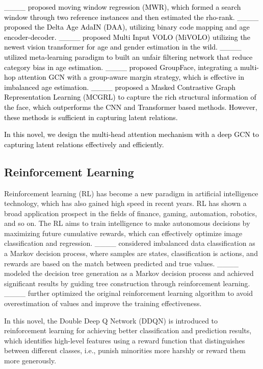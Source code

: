 \textcolor{black}{
____ proposed moving window regression (MWR), which formed a search window through two reference instances and then estimated the rho-rank. ____ proposed the Delta Age AdaIN (DAA), utilizing binary code mapping and age encoder-decoder.  ____ proposed Multi Input VOLO (MiVOLO) utilizing the newest vision transformer for age and gender estimation in the wild. ____ utilized meta-learning paradigm to built an unfair filtering network that reduce category bias in age estimation. ____ proposed GroupFace, integrating a multi-hop attention GCN with a group-aware margin strategy, which is effective in imbalanced age estimation. ____ proposed a Masked Contrastive Graph Representation Learning (MCGRL) to capture the rich structural information of the face, which outperforms the CNN and Transformer based methods. However, these methods is sufficient in capturing latent relations.
}

\textcolor{black}{
In this novel, we design the multi-head attention mechanism with a deep GCN to capturing latent relations effectively and efficiently.}



\subsection{Reinforcement Learning}
Reinforcement learning (RL) has become a new paradigm in artificial intelligence technology, which has also gained high speed in recent years. RL has shown a broad application prospect in the fields of finance, gaming, automation, robotics, and so on. The RL aims to train intelligence to make autonomous decisions by maximizing future cumulative rewards, which can effectively optimize image classification and regression. ____ considered imbalanced data classification as a Markov decision process, where samples are states, classification is actions, and rewards are based on the match between predicted and true values. ____ modeled the decision tree generation as a Markov decision process and achieved significant results by guiding tree construction through reinforcement learning. ____ further optimized the original reinforcement learning algorithm to avoid overestimation of values and improve the training effectiveness. 

In this novel, the Double Deep Q Network (DDQN) is introduced to reinforcement learning for achieving better classification and prediction results, which identifies high-level features using a reward function that distinguishes between different classes, i.e., punish minorities more harshly or reward them more generously.